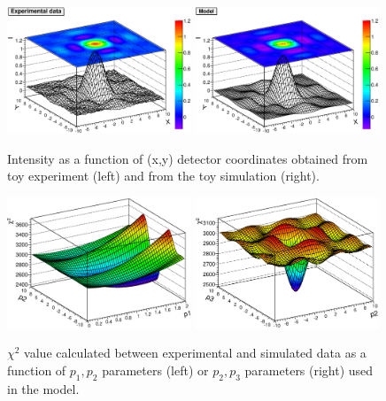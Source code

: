 \begin{figure}[!p]
  \centering
    \includegraphics[width=0.49\textwidth]{Figures/toyfit_expdata.eps}
    \includegraphics[width=0.49\textwidth]{Figures/toyfit_simdata.eps}
  \caption{Intensity as a function of (x,y) detector coordinates  obtained from 
  toy experiment (left) and from the toy simulation (right).   }
  \label{fig:toyfit_data}
  \vspace*{4mm}
    \includegraphics[width=0.49\textwidth]{Figures/toyfit_chi2_p12.eps}
    \includegraphics[width=0.49\textwidth]{Figures/toyfit_chi2_p23.eps}
  \caption{$\chi^{2}$ value calculated between experimental and simulated data
  as a function of $p_1,p_2$ parameters (left) or $p_2,p_3$ 
  parameters (right) used in the model.   }
  \label{fig:toyfit_chi2}
\end{figure}


